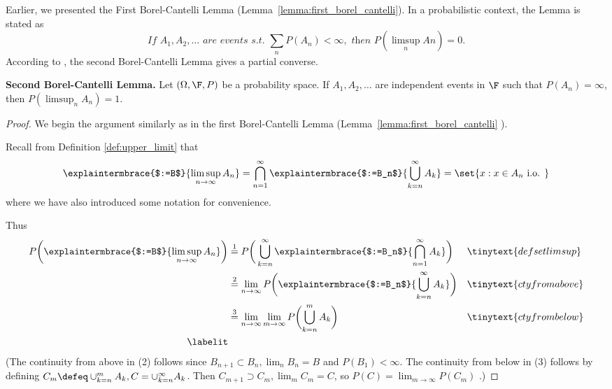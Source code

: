 \documentclass{article} %
\begin{document}
Earlier, we presented the First Borel-Cantelli Lemma (Lemma~\ref{lemma:first_borel_cantelli}). In a probabilistic context, the Lemma is stated as
\[ \textit{If } A_1, A_2, \hdots \textit{ are events s.t. } \sum_n P(A_n) < \infty, \textit{ then } P(\limsup_n An) = 0.\]
%
According to \cite{ash2000probability}, the second Borel-Cantelli Lemma gives a partial converse. 

\begin{lemma}\textbf{Second Borel-Cantelli Lemma.}
Let $(\Omega, \F, P)$ be a probability space. If $A_1, A_2, \hdots$ are independent events in $\F$ such that $P(A_n) = \infty$, then $P(\limsup_n A_n) = 1$.
\end{lemma}

\begin{proof}
We begin the argument similarly as in the first Borel-Cantelli Lemma (Lemma~\ref{lemma:first_borel_cantelli}	). 

Recall from Definition \ref{def:upper_limit} that
\[ \explaintermbrace{$:=B$}{\limsup_{n \to \infty} A_n} = \bigcap_{n=1}^\infty \explaintermbrace{$:=B_n$}{\bigcup_{k=n}^\infty A_k} = \set{x : x \in A_n \text{ i.o. }}  \]	
where we have also introduced some notation for convenience.

Thus 
\begin{align*}
P \bigg( \explaintermbrace{$:=B$}{\limsup_{n \to \infty} A_n} \bigg) &\stackrel{1}{=} P \bigg( \bigcup_{k=n}^\infty  \explaintermbrace{$:=B_n$}{\bigcap_{n=1}^\infty  A_k} \bigg) && \tinytext{def set limsup} \\
& \stackrel{2}{=}  \lim_{n \to \infty} P\bigg( \explaintermbrace{$:=B_n$}{\bigcup_{k=n}^\infty  A_k}  \bigg) && \tinytext{cty from above}\\
& \stackrel{3}{=}  \lim_{n \to \infty}  \lim_{m \to \infty}P\bigg( {\bigcup_{k=n}^{m}  A_k}  \bigg) && \tinytext{cty from below} \\
\labelit \label{eqn:another_intermediate_equation_for_second_borel_equation_lemma}
\end{align*}
{ \scriptsize (The continuity from above in (2) follows since $B_{n+1} \subset B_n, \lim_n B_n = B$ and $P(B_1)<\infty$. The continuity from below in (3) follows by defining $C_m \defeq \cup_{k=n}^m A_k, C=\cup_{k=n}^\infty A_k$.  Then $C_{m+1} \supset C_m, \lim_m C_m = C$, so $P(C) = \lim_{m \to \infty} P(C_m)$    .)}


\end{proof}
\end{document}
